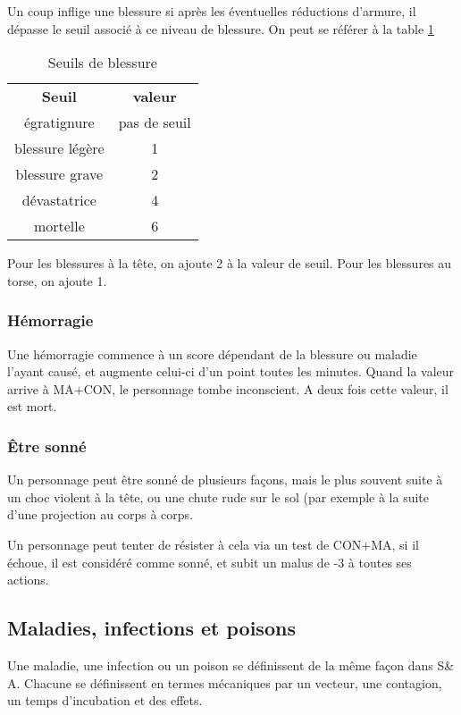 \documentclass[10pt,a4paper,twocolumn]{book}
\begin{document}
Un coup inflige une blessure si après les éventuelles réductions d'armure, il dépasse le seuil associé à ce niveau de blessure. On peut se référer à la table \ref{tableSeuilsBlessures}

\begin{table}
\caption{Seuils de blessure}
\label{tableSeuilsBlessures}
\begin{tabular}{cc}
\textbf{Seuil} & \textbf{valeur} \\
   égratignure & pas de seuil \\
   blessure légère & 1 \\
   blessure grave & 2 \\
   dévastatrice & 4 \\
   mortelle & 6 \\
\end{tabular}
\end{table}

Pour les blessures à la tête, on ajoute 2 à la valeur de seuil. Pour les blessures au torse, on ajoute 1.
\subsubsection{Hémorragie}
Une hémorragie commence à un score dépendant de la blessure ou maladie l'ayant causé, et augmente celui-ci d'un point toutes les minutes. Quand la valeur arrive à MA+CON, le personnage tombe inconscient. A deux fois cette valeur, il est mort.
\subsubsection{\^Etre sonné}
Un personnage peut être sonné de plusieurs façons, mais le plus souvent suite à un choc violent à la tête, ou une chute rude sur le sol (par exemple à la suite d'une projection au corps à corps.

Un personnage peut tenter de résister à cela via un test de CON+MA, si il échoue, il est considéré comme sonné, et subit un malus de -3 à toutes ses actions.
\subsection{Maladies, infections et poisons}
Une maladie, une infection ou un poison se définissent de la même façon dans S\& A. Chacune se définissent en termes mécaniques par un vecteur, une contagion, un temps d'incubation et des effets.
\end{document}
